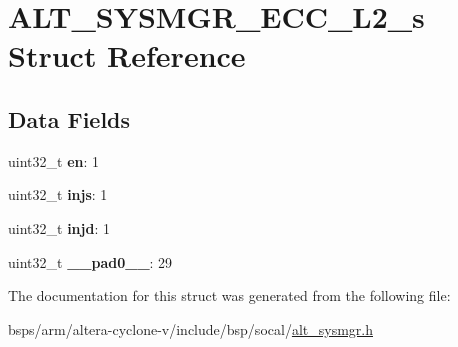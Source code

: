 \hypertarget{structALT__SYSMGR__ECC__L2__s}{}\section{A\+L\+T\+\_\+\+S\+Y\+S\+M\+G\+R\+\_\+\+E\+C\+C\+\_\+\+L2\+\_\+s Struct Reference}
\label{structALT__SYSMGR__ECC__L2__s}
\subsection*{Data Fields}
\begin{DoxyCompactItemize}
\item 
\mbox{\label{structALT__SYSMGR__ECC__L2__s_a04df8d2eea63267fe80f22708a2243e7}} 
uint32\+\_\+t {\bfseries en}\+: 1
\item 
\mbox{\label{structALT__SYSMGR__ECC__L2__s_a51ca4c0d09b36ff1b015e77829929143}} 
uint32\+\_\+t {\bfseries injs}\+: 1
\item 
\mbox{\label{structALT__SYSMGR__ECC__L2__s_a1c74f345455acb758518dbbbc18a3543}} 
uint32\+\_\+t {\bfseries injd}\+: 1
\item 
\mbox{\label{structALT__SYSMGR__ECC__L2__s_a28c033b3c903564ca881ebeda94e9b90}} 
uint32\+\_\+t {\bfseries \+\_\+\+\_\+pad0\+\_\+\+\_\+}\+: 29
\end{DoxyCompactItemize}


The documentation for this struct was generated from the following file\+:\begin{DoxyCompactItemize}
\item 
bsps/arm/altera-\/cyclone-\/v/include/bsp/socal/\mbox{\hyperlink{alt__sysmgr_8h}{alt\+\_\+sysmgr.\+h}}\end{DoxyCompactItemize}
